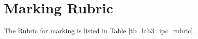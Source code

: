 \begin{enumerate}
\end{enumerate}
\iffalse
Use \verb+zip+ command to archive and compress the contents of lab3 directory and name it \verb+lab3.zip+. We expect the command \verb+unzip lab3.zip+ will produce a \verb+lab3+ sub-directory in the current working directory and under the \verb+lab3+ sub-directory we will find your source code, the Makefile and the lab3\_hostname.csv file.
\fi
\section{Marking Rubric}
The Rubric for marking is listed in Table \ref{tb_lab3_ipc_rubric}.

